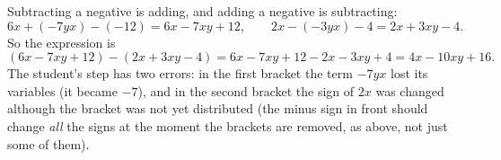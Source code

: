 Subtracting a negative is adding, and adding a negative is subtracting:
\[
6x+(-7yx)-(-12)=6x-7xy+12,\qquad 2x-(-3yx)-4=2x+3xy-4 .
\]
So the expression is
\[
(6x-7xy+12)-(2x+3xy-4)=6x-7xy+12-2x-3xy+4=\boxed{4x-10xy+16} .
\]
The student's step has two errors: in the first bracket the term $-7yx$ lost its variables (it became $-7$), and in the second bracket the sign of $2x$ was changed although the bracket was not yet distributed (the minus sign in front should change \emph{all} the signs at the moment the brackets are removed, as above, not just some of them).
